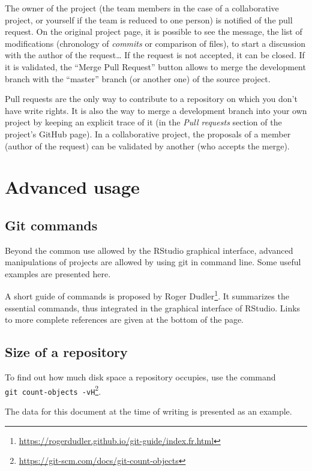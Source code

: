 \documentclass[
  12pt,
  american,
  a4paper,
  extrafontsizes,onecolumn,openright
  ]{memoir}
\newlength{\rf}
\begin{document}
The owner of the project (the team members in the case of a collaborative project, or yourself if the team is reduced to one person) is notified of the pull request.
On the original project page, it is possible to see the message, the list of modifications (chronology of \emph{commits} or comparison of files), to start a discussion with the author of the request\ldots{}
If the request is not accepted, it can be closed.
If it is validated, the \enquote{Merge Pull Request} button allows to merge the development branch with the \enquote{master} branch (or another one) of the source project.

Pull requests are the only way to contribute to a repository on which you don't have write rights.
It is also the way to merge a development branch into your own project by keeping an explicit trace of it (in the \emph{Pull requests} section of the project's GitHub page).
In a collaborative project, the proposals of a member (author of the request) can be validated by another (who accepts the merge).

\section{Advanced usage}\label{advanced-usage}

\subsection{Git commands}\label{git-commands}

Beyond the common use allowed by the RStudio graphical interface, advanced manipulations of projects are allowed by using git in command line.
Some useful examples are presented here.

A short guide of commands is proposed by Roger Dudler\footnote{\url{https://rogerdudler.github.io/git-guide/index.fr.html}}.
It summarizes the essential commands, thus integrated in the graphical interface of RStudio.
Links to more complete references are given at the bottom of the page.

\subsection{Size of a repository}\label{size-of-a-repository}

To find out how much disk space a repository occupies, use the command \texttt{git\ count-objects\ -vH}\footnote{\url{https://git-scm.com/docs/git-count-objects}}.

The data for this document at the time of writing is presented as an example.
\end{document}
